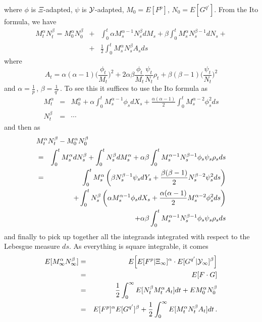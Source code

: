 \documentclass[12pt,a4paper]{book}
\newcommand{\calY}{{\cal Y}}
\begin{document}
\noindent
where $\phi$ is $\Xi$-adapted, $\psi$ is $\calY$-adapted, $M_0=E[F^p]$,
$N_0=E[G^{q'}]$. From the Ito formula, we have
\begin{eqnarray*}
M_t^\alpha N_t^\beta=M_0^\alpha N_0^\beta & + & \int_0^t \alpha
   M_s^{\alpha-1}N_s^\beta dM_s +
             \beta\int_0^t M_s^\alpha N_s^{\beta-1}dN_s+\\
& + & \frac{1}{2}\int_0^t M_s^\alpha N_s^\beta A_s ds
\end{eqnarray*}
where
$$A_t=\alpha(\alpha-1) \Big(\frac{\phi_t}{M_t}\Big)^2
+2\alpha\beta\frac{\phi_t}{M_t}\frac{\psi_t}{N_t}\rho_t+\beta(\beta-1)
\Big(\frac{\psi_t}{N_t}\Big)^2$$
and $\alpha=\frac{1}{p}\,$, $\beta=\frac{1}{q'}\,$.
To see this it suffices to use  the Ito formula as
\begin{eqnarray*}
M_t^\alpha & = & M_0^\alpha+\alpha\int_0^t M_s^{\alpha-1}\phi_s dX_s+
         \frac{\alpha(\alpha-1)}{2}\int_0^t M_s^{\alpha-2}\phi_s^2ds \\
N_t^\beta & = & \cdots
\end{eqnarray*}
and then as
\begin{eqnarray*}
\lefteqn{M_t^\alpha N_t^\beta - M_0^\alpha N_0^\beta}\\
& = & \int_0^t M_s^\alpha
dN_s^\beta + \int_0^t N_s^\beta dM_s^\alpha + \alpha\beta
\int_0^t M_s^{\alpha-1}N_s^{\beta-1}\phi_s\psi_s\rho_s ds \\
& = &\int_0^t M_s^\alpha\left(\beta N_s^{\beta-1}\psi_s
         dY_s+\frac{\beta(\beta-1)}{2}N_s^{\beta-2}\psi_s^2 ds\right) \\
& & +\int_0^t N_s^\beta\left(\alpha M_s^{\alpha-1}\phi_s dX_s +
        \frac{\alpha(\alpha-1)}{2} M_s^{\alpha-2}\phi_s^2 ds\right) \\
& & + \alpha\beta\int_0^t M_s^{\alpha-1}
         N_s^{\beta-1}\phi_s\psi_s\rho_s ds
\end{eqnarray*}
and finally to pick up  together all the  integrands integrated with
respect to the Lebesgue measure $ds$.
\newline
As everything is square integrable, it comes
\begin{eqnarray*}
E[M_ \infty^\alpha N_ \infty^\beta] & = & E\Big[ E[F^p|{\Xi}_
\infty]^\alpha
      \cdot E[G^{q'}|{\calY}_ \infty]^\beta\Big] \\
& = & E[F\cdot G] \\
& = & \frac{1}{2}\int_0^\infty E[N_t^\beta M_t^\alpha A_t]dt +E
    M_0^\alpha N_0^\beta \\
& = & E[F^p]^\alpha E[G^{q'}]^\beta+\frac{1}{2} \int_0^\infty
    E[M_t^\alpha N_t^\beta A_t]dt\,.
\end{eqnarray*}
\end{document}
